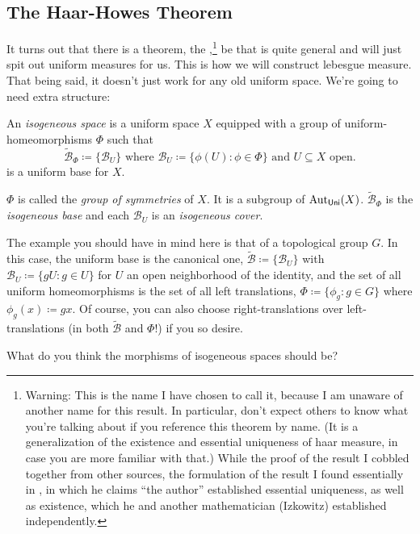 \subsection{The Haar-Howes Theorem}

It turns out that there is a theorem, the ,\footnote{Warning:  This is the name I have chosen to call it, because I am unaware of another name for this result.  In particular, don't expect others to know what you're talking about if you reference this theorem by name.  (It is a generalization of the existence and essential uniqueness of haar measure, in case you are more familiar with that.)  While the proof of the result I cobbled together from other sources, the formulation of the result I found essentially in \cite{Howes}, in which he claims ``the author'' established essential uniqueness, as well as existence, which he and another mathematician (Izkowitz) established independently.}  be that is quite general and will just spit out uniform measures for us.  This is how we will construct lebesgue measure.  That being said, it doesn't just work for any old uniform space.  We're going to need extra structure:
\begin{dfn}\label{IsogeneousSpace}
An \emph{isogeneous space} is a uniform space $X$ equipped with a group of uniform-homeomorphisms $\Phi$ such that
\begin{equation}\label{5.1.28}
\widetilde{\mathcal{B}}_\Phi \coloneqq \{ \mathcal{B}_U\} \text{ where }\mathcal{B}_U\coloneqq \{ \phi (U):\phi \in \Phi\} \text{ and }U\subseteq X\text{ open}.
\end{equation}
is a uniform base for $X$.
\begin{rmk}
$\Phi$ is called the \emph{group of symmetries} of $X$.  It is a subgroup of $\operatorname{Aut} _{\mathsf{Uni}}(X)$.  $\widetilde{\mathcal{B}}_{\Phi}$ is the \emph{isogeneous base} and each $\mathcal{B}_U$ is an \emph{isogeneous cover}.
\end{rmk}
\begin{rmk}
The example you should have in mind here is that of a topological group $G$.  In this case, the uniform base is the canonical one, $\widetilde{\mathcal{B}}\coloneqq \{ \mathcal{B}_U\}$ with $\mathcal{B}_U\coloneqq \{ gU:g\in U\}$ for $U$ an open neighborhood of the identity, and the set of all uniform homeomorphisms is the set of all left translations, $\Phi \coloneqq \{ \phi _g:g\in G\}$ where $\phi _g(x)\coloneqq gx$.  Of course, you can also choose right-translations over left-translations (in both $\widetilde{\mathcal{B}}$ and $\Phi$!) if you so desire.
\end{rmk}
\begin{rmk}
What do you think the morphisms of isogeneous spaces should be?
\end{rmk}
\end{dfn}
